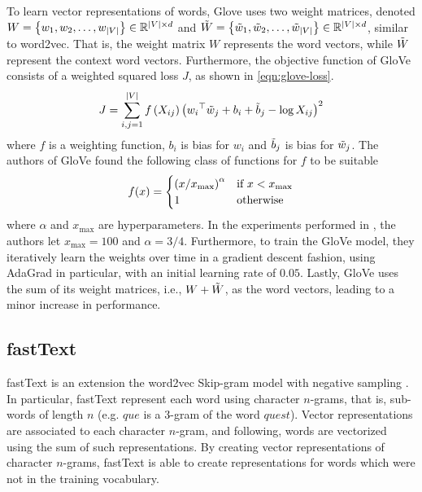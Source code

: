 To learn vector representations of words, Glove uses two weight matrices, denoted $W=\left\{w_1, w_2, \ldots, w_{|V|}\right\} \in \mathbb{R}^{|V| \times d}$ and $\Tilde{W}=\left\{\Tilde{w}_1, \Tilde{w}_2, \ldots, \Tilde{w}_{|V|}\right\} \in \mathbb{R}^{|V| \times d}$, similar to word2vec. That is, the weight matrix $W$ represents the word vectors, while $\Tilde{W}$ represent the context word vectors. Furthermore, the objective function of GloVe consists of a weighted squared loss $J$, as shown in \cref{eqn:glove-loss}.
\begin{align}
    J = \sum\limits_{i, j = 1}^{|V|} f \left(X_{ij}\right) \left({w_i}^\top \Tilde{w}_j + b_i + \Tilde{b}_j - \log X_{ij}\right)^2
    \label{eqn:glove-loss}
\end{align}
where $f$ is a weighting function, $b_i$ is bias for $w_i$ and $\Tilde{b}_j$ is bias for $\Tilde{w}_j$. The authors of GloVe found the following class of functions for $f$ to be suitable
\begin{align}
    f(x) = \begin{cases}
        \left(x / x_{\text{max}}\right)^\alpha & \mbox{if } x < x_{\text{max}} \\
        1 & \text{otherwise}
    \end{cases}
    \label{eqn:glove-loss-f-function}
\end{align}
where $\alpha$ and $x_{\text{max}}$ are hyperparameters. In the experiments performed in \cite{pennington2014glove}, the authors let $x_{\text{max}}=100$ and $\alpha=3/4$. Furthermore, to train the GloVe model, they iteratively learn the weights over time in a gradient descent fashion, using AdaGrad \cite{Duchi2011} in particular, with an initial learning rate of $0.05$. Lastly, GloVe uses the sum of its weight matrices, i.e., $W + \Tilde{W}$, as the word vectors, leading to a minor increase in performance.

\subsection{fastText}
fastText is an extension the word2vec Skip-gram model with negative sampling \cite{bojanowski2017enriching}. In particular, fastText represent each word using character $n$-grams, that is, sub-words of length $n$ (e.g. $\textit{que}$ is a $3$-gram of the word $\textit{quest}$). Vector representations are associated to each character $n$-gram, and following, words are vectorized using the sum of such representations. By creating vector representations of character $n$-grams, fastText is able to create representations for words which were not in the training vocabulary.


